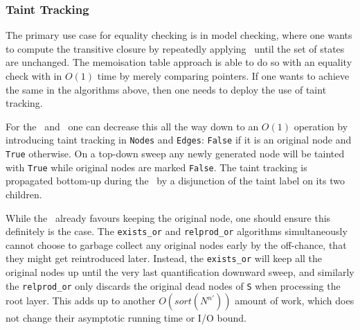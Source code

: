 \subsubsection{Taint Tracking}
The primary use case for equality checking is in model checking, where one wants
to compute the transitive closure by repeatedly applying \RelProd\ until the set
of states are unchanged. The memoisation table approach is able to do so with an
equality check with in $O(1)$ time by merely comparing pointers. If one wants to
achieve the same in the algorithms above, then one needs to deploy the use of
taint tracking.

For the \Exists\ and \RelProd\ one can decrease this all the way down to an
$O(1)$ operation by introducing taint tracking in \lstinline{Nodes} and
\lstinline{Edges}: \lstinline{False} if it is an original node and
\lstinline{True} otherwise. On a top-down sweep any newly generated node will be
tainted with \lstinline{True} while original nodes are marked \lstinline{False}.
The taint tracking is propagated bottom-up during the \Reduce\ by a disjunction
of the taint label on its two children.

While the \Reduce\ already favours keeping the original node, one should ensure
this definitely is the case. The \lstinline{exists_or} and
\lstinline{relprod_or} algorithms simultaneously cannot choose to garbage
collect any original nodes early by the off-chance, that they might get
reintroduced later. Instead, the \lstinline{exists_or} will keep all the
original nodes up until the very last quantification downward sweep, and
similarly the \lstinline{relprod_or} only discards the original dead nodes of
\lstinline{S} when processing the root layer. This adds up to another
$O(sort(N^{n'}))$ amount of work, which does not change their asymptotic running
time or I/O bound.


